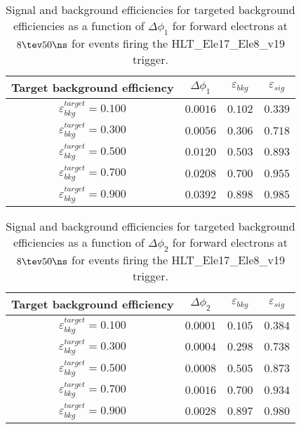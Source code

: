 \clearpage

\begin{table}[!bht]
  \begin{center}
    \begin{tabular}{cccc}
      \hline
      Target background efficiency & $\Delta\phi_1$ & $\varepsilon_{bkg}$ & $\varepsilon_{sig}$ \\ 
      \hline
      $\varepsilon_{bkg}^{target} = 0.100$ & $  0.0016$ & $0.102$ & $0.339$ \\
      $\varepsilon_{bkg}^{target} = 0.300$ & $  0.0056$ & $0.306$ & $0.718$ \\
      $\varepsilon_{bkg}^{target} = 0.500$ & $  0.0120$ & $0.503$ & $0.893$ \\
      $\varepsilon_{bkg}^{target} = 0.700$ & $  0.0208$ & $0.700$ & $0.955$ \\
      $\varepsilon_{bkg}^{target} = 0.900$ & $  0.0392$ & $0.898$ & $0.985$ \\
      \hline
    \end{tabular}
    \caption{Signal and background efficiencies for targeted background efficiencies as a function of $\Delta\phi_1$ for forward electrons at $8\tev 50\ns$ for events firing the HLT\_Ele17\_Ele8\_v19 trigger.}
    \label{tab:eff_rej_phi1_beam_8_50_trigger_17_8_F}
  \end{center}
\end{table}

\clearpage

\begin{table}[!bht]
  \begin{center}
    \begin{tabular}{cccc}
      \hline
      Target background efficiency & $\Delta\phi_2$ & $\varepsilon_{bkg}$ & $\varepsilon_{sig}$ \\ 
      \hline
      $\varepsilon_{bkg}^{target} = 0.100$ & $  0.0001$ & $0.105$ & $0.384$ \\
      $\varepsilon_{bkg}^{target} = 0.300$ & $  0.0004$ & $0.298$ & $0.738$ \\
      $\varepsilon_{bkg}^{target} = 0.500$ & $  0.0008$ & $0.505$ & $0.873$ \\
      $\varepsilon_{bkg}^{target} = 0.700$ & $  0.0016$ & $0.700$ & $0.934$ \\
      $\varepsilon_{bkg}^{target} = 0.900$ & $  0.0028$ & $0.897$ & $0.980$ \\
      \hline
    \end{tabular}
    \caption{Signal and background efficiencies for targeted background efficiencies as a function of $\Delta\phi_2$ for forward electrons at $8\tev 50\ns$ for events firing the HLT\_Ele17\_Ele8\_v19 trigger.}
    \label{tab:eff_rej_phi2_beam_8_50_trigger_17_8_F}
  \end{center}
\end{table}

